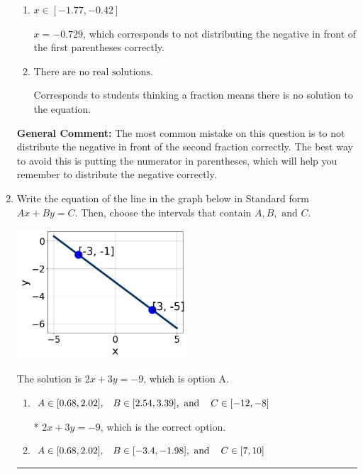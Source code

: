 \documentclass{extbook}[14pt]
\newcommand{\litem}[1]{\item #1

\rule{\textwidth}{0.4pt}}
\begin{document}
\begin{enumerate}
{\begin{enumerate}[label=\Alph*.]
$x = 0.729$, which corresponds to not distributing the negative in front of the second parentheses correctly.
\item \( x \in [-1.77, -0.42] \)

$x = -0.729$, which corresponds to not distributing the negative in front of the first parentheses correctly.
\item \( \text{There are no real solutions.} \)

Corresponds to students thinking a fraction means there is no solution to the equation.
\end{enumerate}

\textbf{General Comment:} The most common mistake on this question is to not distribute the negative in front of the second fraction correctly. The best way to avoid this is putting the numerator in parentheses, which will help you remember to distribute the negative correctly.
}
\litem{
Write the equation of the line in the graph below in Standard form $Ax+By=C$. Then, choose the intervals that contain $A, B, \text{ and } C$.

\begin{center}
    \includegraphics[width=0.5\textwidth]{../Figures/linearGraphToStandardA.png}
\end{center}



The solution is \( 2x + 3y = -9 \), which is option A.\begin{enumerate}[label=\Alph*.]
\item \( A \in [0.68, 2.02], \hspace{3mm} B \in [2.54, 3.39], \text{ and } \hspace{3mm} C \in [-12, -8] \)

* $2x + 3y = -9$, which is the correct option.
\item \( A \in [0.68, 2.02], \hspace{3mm} B \in [-3.4, -1.98], \text{ and } \hspace{3mm} C \in [7, 10] \)


\end{enumerate}}
\end{enumerate}
\end{document}
